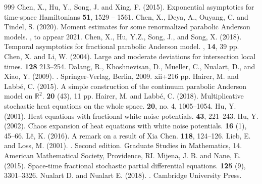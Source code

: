 \documentclass[a4paper,11pt]{article}
\numberwithin{equation}{section}
\numberwithin{equation}{section}
\theoremstyle{plain}
\theoremstyle{definition}
\newcommand{\R}{\mathbb{R}}
\begin{document}
\begin{thebibliography}{999}
  Chen, X., Hu, Y., Song, J. and Xing, F. (2015).
  \newblock Exponential asymptotics for time-space Hamiltonians
   \textbf{51}, 1529 -- 1561.
  Chen, X., Deya, A., Ouyang, C. and Tindel, S. (2020).
  \newblock Moment estimates for some renormalized parabolic Anderson models.
  , to appear 2021.
  Chen, X., Hu, Y.Z., Song, J., and Song, X. (2018).
  \newblock Temporal asymptotics for fractional parabolic Anderson model.
  , {\bf 14}, 39 pp.
  Chen, X. and Li, W. (2004).
  \newblock Large and moderate deviations for intersection local times.
   {\bf 128} 213--254.
  Dalang, R., Khoshnevisan, D., Mueller, C., Nualart, D., and Xiao, Y. (2009).
  .
  \newblock Springer-Verlag, Berlin, 2009. xii+216 pp.
  Hairer, M. and Labb\'e, C. (2015).
  \newblock A simple construction of the continuum parabolic Anderson model on $\R^2$.
   \textbf{20} (43), 11 pp.
  Hairer, M. and Labb\'e, C. (2018).
  \newblock Multiplicative stochastic heat equations on the whole space.
   \textbf{20}, no. 4, 1005--1054.
  Hu, Y. (2001).
  \newblock Heat equations with fractional white noise potentials.
   \textbf{43}, 221--243.
  Hu, Y. (2002).
  \newblock Chaos expansion of heat equations with white noise potentials.
   \textbf{16} (1), 45--66.
  L\^e, K. (2016).
  \newblock A remark on a result of Xia Chen.
   {\bf 118}, 124--126.
  Lieb, E. and Loss, M. (2001).
  . Second edition.
  \newblock Graduate Studies in Mathematics, 14. American Mathematical Society, Providence, RI.
  Mijena, J. B. and Nane, E. (2015).
  \newblock Space-time fractional stochastic partial differential equations.
   \textbf{125} (9), 3301--3326.
  Nualart D. and Nualart E. (2018).
  .
  \newblock Cambridge University Press.
\end{thebibliography}
\end{document}

